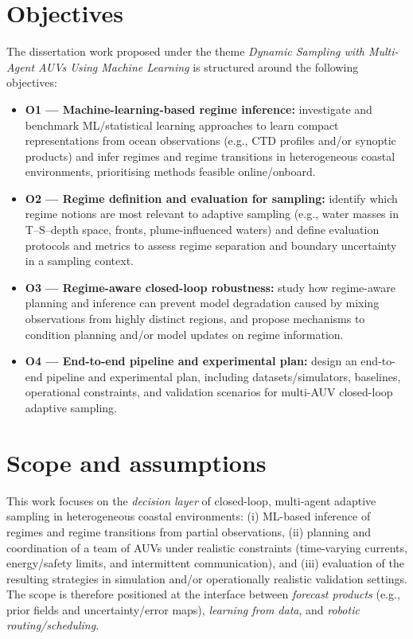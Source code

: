 \section{Objectives} \label{sec:objectives}

The dissertation work proposed under the theme \emph{Dynamic Sampling with Multi-Agent AUVs Using Machine Learning} is structured around the following objectives:

\begin{itemize}
  \item \textbf{O1 --- Machine-learning-based regime inference:} investigate and benchmark ML/statistical learning approaches to learn compact representations from ocean observations (e.g., CTD profiles and/or synoptic products) and infer regimes and regime transitions in heterogeneous coastal environments, prioritising methods feasible online/onboard.

  \item \textbf{O2 --- Regime definition and evaluation for sampling:} identify which regime notions are most relevant to adaptive sampling (e.g., water masses in T--S--depth space, fronts, plume-influenced waters) and define evaluation protocols and metrics to assess regime separation and boundary uncertainty in a sampling context.

  \item \textbf{O3 --- Regime-aware closed-loop robustness:} study how regime-aware planning and inference can prevent model degradation caused by mixing observations from highly distinct regions, and propose mechanisms to condition planning and/or model updates on regime information.

  \item \textbf{O4 --- End-to-end pipeline and experimental plan:} design an end-to-end pipeline and experimental plan, including datasets/simulators, baselines, operational constraints, and validation scenarios for multi-AUV closed-loop adaptive sampling.
\end{itemize}


\section{Scope and assumptions} \label{sec:scope_assumptions}

This work focuses on the \emph{decision layer} of closed-loop, multi-agent adaptive sampling in heterogeneous coastal environments: (i) ML-based inference of regimes and regime transitions from partial observations, (ii) planning and coordination of a team of AUVs under realistic constraints (time-varying currents, energy/safety limits, and intermittent communication), and (iii) evaluation of the resulting strategies in simulation and/or operationally realistic validation settings. The scope is therefore positioned at the interface between \emph{forecast products} (e.g., prior fields and uncertainty/error maps), \emph{learning from data}, and \emph{robotic routing/scheduling}.

